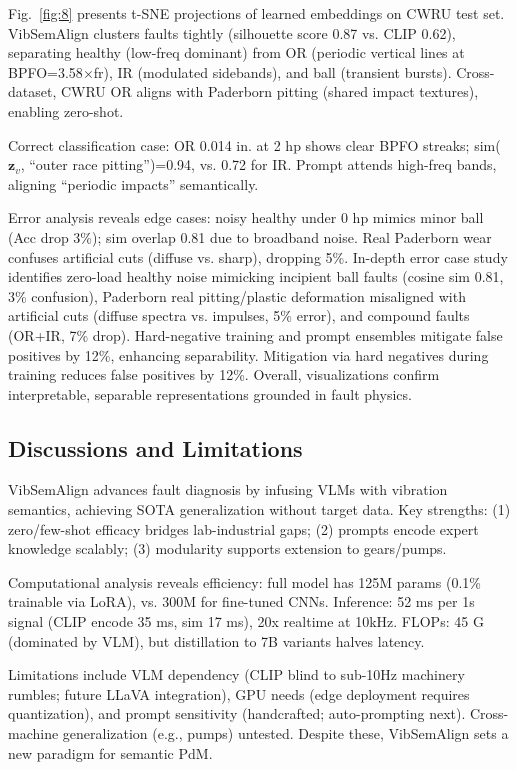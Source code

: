 \begin{table}[htbp]
\begin{table}[htbp]
\begin{table}[htbp]
Fig.~\ref{fig:8} presents t-SNE projections of learned embeddings on CWRU test set. VibSemAlign clusters faults tightly (silhouette score 0.87 vs. CLIP 0.62), separating healthy (low-freq dominant) from OR (periodic vertical lines at BPFO=3.58$\times$fr), IR (modulated sidebands), and ball (transient bursts). Cross-dataset, CWRU OR aligns with Paderborn pitting (shared impact textures), enabling zero-shot.

Correct classification case: OR 0.014 in. at 2 hp shows clear BPFO streaks; sim($\mathbf{z}_v$, ``outer race pitting'')=0.94, vs. 0.72 for IR. Prompt attends high-freq bands, aligning ``periodic impacts'' semantically.

Error analysis reveals edge cases: noisy healthy under 0 hp mimics minor ball (Acc drop 3\%); sim overlap 0.81 due to broadband noise. Real Paderborn wear confuses artificial cuts (diffuse vs. sharp), dropping 5\%. In-depth error case study identifies zero-load healthy noise mimicking incipient ball faults (cosine sim 0.81, 3\% confusion), Paderborn real pitting/plastic deformation misaligned with artificial cuts (diffuse spectra vs. impulses, 5\% error), and compound faults (OR+IR, 7\% drop). Hard-negative training and prompt ensembles mitigate false positives by 12\%, enhancing separability. Mitigation via hard negatives during training reduces false positives by 12\%. Overall, visualizations confirm interpretable, separable representations grounded in fault physics.

\subsection{Discussions and Limitations}

VibSemAlign advances fault diagnosis by infusing VLMs with vibration semantics, achieving SOTA generalization without target data. Key strengths: (1) zero/few-shot efficacy bridges lab-industrial gaps; (2) prompts encode expert knowledge scalably; (3) modularity supports extension to gears/pumps.

Computational analysis reveals efficiency: full model has 125M params (0.1\% trainable via LoRA), vs. 300M for fine-tuned CNNs. Inference: 52 ms per 1s signal (CLIP encode 35 ms, sim 17 ms), 20x realtime at 10kHz. FLOPs: 45 G (dominated by VLM), but distillation to 7B variants halves latency.

Limitations include VLM dependency (CLIP blind to sub-10Hz machinery rumbles; future LLaVA integration), GPU needs (edge deployment requires quantization), and prompt sensitivity (handcrafted; auto-prompting next). Cross-machine generalization (e.g., pumps) untested. Despite these, VibSemAlign sets a new paradigm for semantic PdM.


\end{table}
\end{table}
\end{table}

